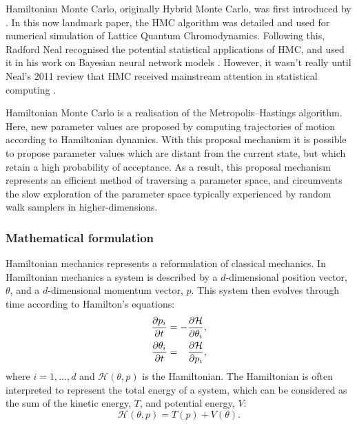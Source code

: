 Hamiltonian Monte Carlo, originally Hybrid Monte Carlo, was first introduced by
\textcite{duane87}. In this now landmark paper, the HMC algorithm was detailed
and used for numerical simulation of Lattice Quantum Chromodynamics. Following
this, Radford Neal recognised the potential statistical applications of HMC,
and used it in his work on Bayesian neural network models \parencite{neal95}.
However, it wasn't really until Neal's 2011 review \parencite{neal11} that HMC
received mainstream attention in statistical computing
\parencite{betancourt18}.

Hamiltonian Monte Carlo is a realisation of the Metropolis--Hastings algorithm.
Here, new parameter values are proposed by computing trajectories of motion
according to Hamiltonian dynamics. With this proposal mechanism it is possible
to propose parameter values which are distant from the current state, but which
retain a high probability of acceptance. As a result, this proposal mechanism
represents an efficient method of traversing a parameter space, and circumvents
the slow exploration of the parameter space typically experienced by random
walk samplers in higher-dimensions.

\subsubsection{Mathematical formulation}

Hamiltonian mechanics represents a reformulation of classical mechanics. In
Hamiltonian mechanics a  system is described by a $d$-dimensional position
vector, $\theta$, and a $d$-dimensional momentum vector, $p$. This system then
evolves through time according to Hamilton's equations:
\begin{align}
  \begin{split}
    \pdv{p_i}{t}      &= - \pdv{\mathcal{H}}{\theta_i},      \\
    \pdv{\theta_i}{t} &= \hphantom{-} \pdv{\mathcal{H}}{p_i},
  \end{split}
\end{align}
where $i=1,\ldots,d$ and $\mathcal{H}(\theta,  p)$ is the Hamiltonian. The
Hamiltonian is often interpreted to represent the total energy of a system,
which can be considered as the sum of the kinetic energy, $T$, and potential
energy, $V$:
\begin{equation}
  \label{eq:hamiltonian_decomp}
  \mathcal{H}(\theta, p) = T(p) + V(\theta).
\end{equation}

